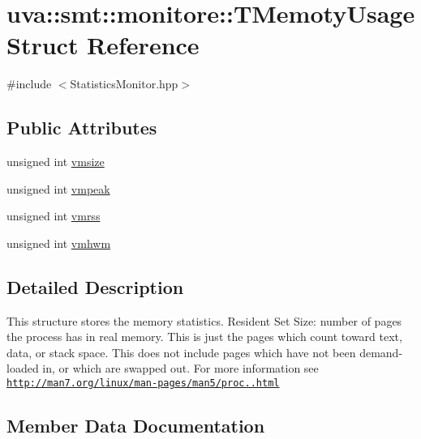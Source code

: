 \hypertarget{structuva_1_1smt_1_1monitore_1_1_t_memoty_usage}{}\section{uva\+:\+:smt\+:\+:monitore\+:\+:T\+Memoty\+Usage Struct Reference}
\label{structuva_1_1smt_1_1monitore_1_1_t_memoty_usage}


{\ttfamily \#include $<$Statistics\+Monitor.\+hpp$>$}

\subsection*{Public Attributes}
\begin{DoxyCompactItemize}
\item 
unsigned int \hyperlink{structuva_1_1smt_1_1monitore_1_1_t_memoty_usage_a2899bd97567443117eb064ee4ced277e}{vmsize}
\item 
unsigned int \hyperlink{structuva_1_1smt_1_1monitore_1_1_t_memoty_usage_ad95a47875e4fb92f9fac3d0960386e77}{vmpeak}
\item 
unsigned int \hyperlink{structuva_1_1smt_1_1monitore_1_1_t_memoty_usage_a55337bfac835a2cdf05d98db116615da}{vmrss}
\item 
unsigned int \hyperlink{structuva_1_1smt_1_1monitore_1_1_t_memoty_usage_a4a7ea0bbc7e0a06c85bd7ed53d3c022a}{vmhwm}
\end{DoxyCompactItemize}


\subsection{Detailed Description}
This structure stores the memory statistics. Resident Set Size\+: number of pages the process has in real memory. This is just the pages which count toward text, data, or stack space. This does not include pages which have not been demand-\/loaded in, or which are swapped out. For more information see \href{http://man7.org/linux/man-pages/man5/proc.5.html}{\tt http\+://man7.\+org/linux/man-\/pages/man5/proc..\+html} 

\subsection{Member Data Documentation}
\hypertarget{structuva_1_1smt_1_1monitore_1_1_t_memoty_usage_a4a7ea0bbc7e0a06c85bd7ed53d3c022a}{}
